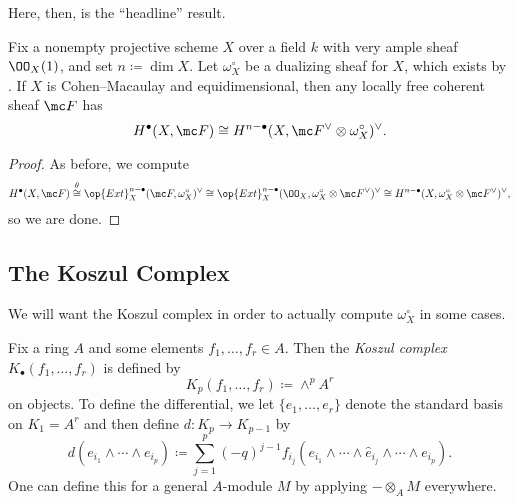\documentclass[../notes.tex]{subfiles}
\begin{document}
Here, then, is the ``headline'' result.
\begin{corollary} \label{cor:serre-duality}
	Fix a nonempty projective scheme $X$ over a field $k$ with very ample sheaf $\OO_X(1)$, and set $n\coloneqq\dim X$. Let $\omega_X^\circ$ be a dualizing sheaf for $X$, which exists by . If $X$ is Cohen--Macaulay and equidimensional, then any locally free coherent sheaf $\mc F$ has
	\[H^\bullet(X,\mc F)\cong H^{n-\bullet}(X,\mc F^\lor\otimes\omega_X^\circ)^\lor.\]
\end{corollary}
\begin{proof}
	As before, we compute
	\[H^\bullet(X,\mc F)\stackrel\theta\cong\op{Ext}^{n-\bullet}_X(\mc F,\omega_X^\circ)^\lor\cong\op{Ext}^{n-\bullet}_X(\OO_X,\omega_X^\circ\otimes\mc F^\lor)^\lor\cong H^{n-\bullet}(X,\omega_X^\circ\otimes\mc F^\lor)^\lor,\]
	so we are done.
\end{proof}

\subsection{The Koszul Complex}
We will want the Koszul complex in order to actually compute $\omega_X^\circ$ in some cases.
\begin{definition}
	Fix a ring $A$ and some elements $f_1,\ldots,f_r\in A$. Then the \textit{Koszul complex} $K_\bullet(f_1,\ldots,f_r)$ is defined by
	\[K_p(f_1,\ldots,f_r)\coloneqq\land^pA^r\]
	on objects. To define the differential, we let $\{e_1,\ldots,e_r\}$ denote the standard basis on $K_1=A^r$ and then define $d\colon K_p\to K_{p-1}$ by
	\[d(e_{i_1}\land\cdots\land e_{i_p})\coloneqq\sum_{j=1}^p(-q)^{j-1}f_{i_j}(e_{i_1}\land\cdots\land\widehat e_{i_j}\land\cdots\land e_{i_p}).\]
	One can define this for a general $A$-module $M$ by applying $-\otimes_AM$ everywhere.
\end{definition}
\end{document}
